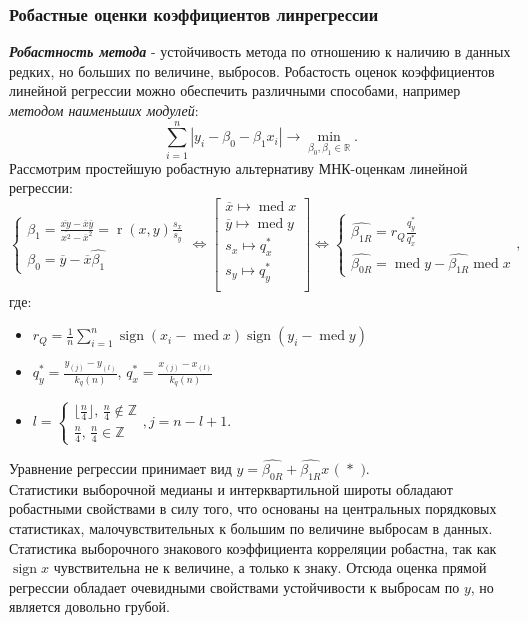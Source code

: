 \documentclass[14pt]{extarticle}
\DeclareMathOperator{\med}{med} %
\DeclareMathOperator{\pirs}{r} %
\DeclareMathOperator{\sign}{sign} %
\begin{document}
\subsubsection{Робастные оценки коэффициентов линрегрессии}
\textbf{\textit{Робастность метода}} - устойчивость метода по отношению к наличию в данных редких, но больших по величине, выбросов. Робастость оценок коэффициентов линейной регрессии можно обеспечить различными способами, например \textit{методом наименьших модулей}: \[\sum\limits_{i=1}^n|y_i-\beta_0-\beta_1x_i|\to\min\limits_{\beta_0,\beta_1\in\mathbb{R}}^{}.\]
Рассмотрим простейшую робастную альтернативу МНК-оценкам линейной регрессии:\[
\begin{cases}
    \beta_1=\frac{\overline{xy}-\overline{x}\overline{y}}{\overline{x^2}-\overline{x}^2}=\pirs{(x, y)}\frac{s_x}{s_y}\\
    \beta_0=\overline{y}-\overline{x}\widehat{\beta_1}
\end{cases} \iff
\begin{bmatrix}
    \overline{x}\mapsto\med{x} \\
    \overline{y}\mapsto\med{y} \\
    s_x\mapsto q_x^{\ast}\\
    s_y\mapsto q_y^{\ast}\\
\end{bmatrix} \iff
\begin{cases}
    \widehat{\beta_{1R}}=r_Q\frac{q_y^{\ast}}{q_x^{\ast}}\\
    \widehat{\beta_{0R}}=\med{y}-\widehat{\beta_{1R}}\med{x}
\end{cases},
\] где:
\begin{itemize}
    \item \(r_Q=\frac{1}{n}\sum\limits_{i=1}^n\sign{(x_i-\med{x})}\sign{(y_i-\med{y})}\)\\
    \item \(q_y^{\ast}=\frac{y_{(j)}-y_{(l)}}{k_q(n)}\), \(q_x^{\ast}=\frac{x_{(j)}-x_{(l)}}{k_q(n)}\)\\
    \item \(l=
    \begin{cases}
        \lfloor\frac{n}{4}\rfloor\text{,   }\frac{n}{4}\notin\mathbb{Z}\\
        \frac{n}{4}\text{, }\frac{n}{4}\in\mathbb{Z}
    \end{cases}, j=n-l+1.
    \)
\end{itemize}
Уравнение регрессии принимает вид \(y=\widehat{\beta_{0R}}+\widehat{\beta_{1R}}x\text{ ( }\ast\text{ )}\).\\
Статистики выборочной медианы и интерквартильной широты обладают робастными свойствами в силу того, что основаны на центральных порядковых статистиках, малочувствительных к большим по величине выбросам в данных. Статистика выборочного знакового коэффициента корреляции робастна, так как \(\sign{x}\) чувствительна не к величине, а только к знаку. Отсюда оценка прямой регрессии обладает очевидными свойствами устойчивости к выбросам по \(y\), но является довольно грубой.
\end{document}
